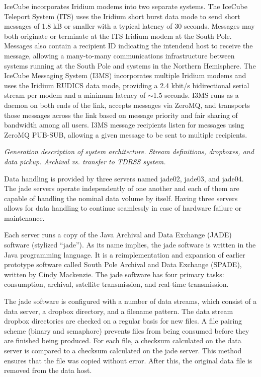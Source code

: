IceCube incorporates Iridium modems into two separate systems.  The IceCube Teleport System (ITS) uses the Iridium short burst
data mode to send short messages of 1.8 kB or smaller with a typical latency of 30 seconds.  Messages may both originate or terminate
at the ITS Iridium modem at the South Pole.  Messages also contain a recipient ID indicating the intendend host to receive
the message, allowing a many-to-many communications infrastructure between systems running at the South Pole and systems
in the Northern Hemisphere.  The IceCube Messaging System (I3MS) incorporates multiple Iridium modems and uses the Iridium RUDICS
data mode, providing a 2.4 kbit/s bidirectional serial stream per modem and a minimum latency of $\sim$1.5 seconds.
I3MS runs as a daemon on both ends of the link, accepts messages via ZeroMQ, and transports those messages across the link
based on message priority and fair sharing of bandwidth among all users.  I3MS message recipients listen for messages
using ZeroMQ PUB-SUB, allowing a given message to be sent to multiple recipients.

\textsl{Generation description of system architecture.  Stream definitions, dropboxes,
and data pickup.  Archival vs. transfer to TDRSS system.  }

Data handling is provided by three servers named jade02, jade03, and jade04. The jade servers operate independently of one another and 
each of them are capable of handling the nominal data volume by itself. Having three servers allows for data handling to continue seamlessly 
in case of hardware failure or maintenance.

Each server runs a copy of the Java Archival and Data Exchange (JADE) software (stylized “jade”). As its name implies, the jade software 
is written in the Java programming language. It is a reimplementation and expansion of earlier prototype software called South Pole Archival
and Data Exchange (SPADE), written by Cindy Mackenzie. The jade software has four primary tasks: consumption, archival, satellite transmission, and real-time
transmission.

The jade software is configured with a number of data streams, which consist of a data server, a dropbox directory, and a filename pattern. 
The data stream dropbox directories are checked on a regular basis for new files. A file pairing scheme (binary and semaphore) prevents files 
from being consumed before they are finished being produced. For each file, a checksum calculated on the data server is compared to a checksum 
calculated on the jade server. This method ensures that the file was copied without error. After this, the original data file is removed from the data host.

